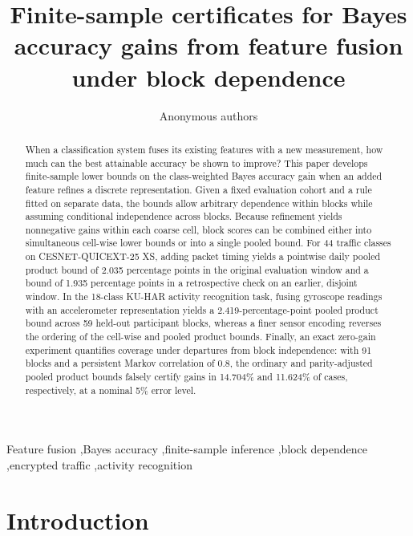 \documentclass[preprint,11pt]{elsarticle}
\begin{document}
\begin{frontmatter}

\title{Finite-sample certificates for Bayes accuracy gains from feature fusion under block dependence}
\author{Anonymous authors}
\date{}

\begin{abstract}
When a classification system fuses its existing features with a new measurement, how much can the best attainable accuracy be shown to improve? This paper develops finite-sample lower bounds on the class-weighted Bayes accuracy gain when an added feature refines a discrete representation. Given a fixed evaluation cohort and a rule fitted on separate data, the bounds allow arbitrary dependence within blocks while assuming conditional independence across blocks. Because refinement yields nonnegative gains within each coarse cell, block scores can be combined either into simultaneous cell-wise lower bounds or into a single pooled bound. For 44 traffic classes on CESNET-QUICEXT-25 XS, adding packet timing yields a pointwise daily pooled product bound of 2.035 percentage points in the original evaluation window and a bound of 1.935 percentage points in a retrospective check on an earlier, disjoint window. In the 18-class KU-HAR activity recognition task, fusing gyroscope readings with an accelerometer representation yields a 2.419-percentage-point pooled product bound across 59 held-out participant blocks, whereas a finer sensor encoding reverses the ordering of the cell-wise and pooled product bounds. Finally, an exact zero-gain experiment quantifies coverage under departures from block independence: with 91 blocks and a persistent Markov correlation of 0.8, the ordinary and parity-adjusted pooled product bounds falsely certify gains in 14.704\% and 11.624\% of cases, respectively, at a nominal 5\% error level.
\end{abstract}

\begin{keyword}
Feature fusion \sep Bayes accuracy \sep finite-sample inference \sep block dependence \sep encrypted traffic \sep activity recognition
\end{keyword}
\end{frontmatter}

\section{Introduction}
\end{document}

